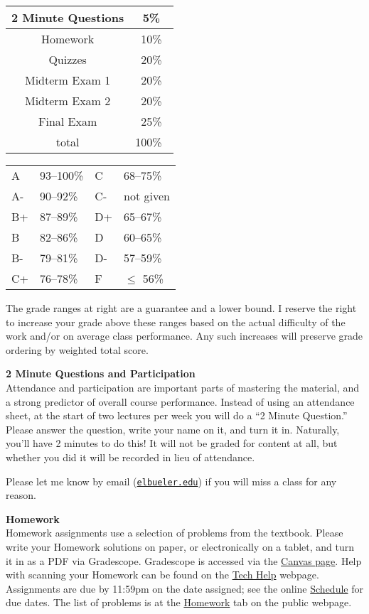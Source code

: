 \documentclass[12pt]{article}
\renewcommand{\emph}[1]{\textsf{\textbf{#1}}}
\newcommand{\localhead}[1]{\par\smallskip\textbf{#1} \smallskip\nobreak\\}%
\def\heading#1{\localhead{\large\emph{#1}}}
\begin{document}
\begin{multicols}{2}
\begin{tabular}{|c|c|}
\hline
2 Minute Questions & 5\%\\
\hline
Homework & 10\% \\
\hline
Quizzes & 20\% \\
\hline
Midterm Exam 1 & 20\% \\
\hline
Midterm Exam 2 & 20\%  \\
\hline
Final Exam & 25\% \\
\hline
total & 100\% \, \\
\hline
\end{tabular}


\begin{tabular}{llll}
A  & 93--100\%& C  & 68--75\%  \\
A- & 90--92\% & C- & not given \\
B+ & 87--89\% & D+ & 65--67\%  \\
B  & 82--86\% & D  & 60--65\%  \\
B- & 79--81\% & D- & 57--59\%  \\
C+ & 76--78\% & F  & $\le$ 56\%
\end{tabular}
\end{multicols}

The grade ranges at right are a guarantee and a lower bound. I reserve the right to increase your grade above these ranges based on the actual difficulty of the work and/or on average class performance.  Any such increases will preserve grade ordering by weighted total score. 


\heading{2 Minute Questions and Participation}
Attendance and participation are important parts of mastering the material, and a strong predictor of overall course performance.  Instead of using an attendance sheet, at the start of two lectures per week you will do a ``2 Minute Question.''  Please answer the question, write your name on it, and turn it in.  Naturally, you'll have 2 minutes to do this!  It will not be graded for content at all, but whether you did it will be recorded in lieu of attendance.

Please let me know by email (\href{mailto:elbueler@alaska.edu}{\texttt{elbueler\@@alaska.edu}}) if you will miss a class for any reason.


\heading{Homework}
Homework assignments use a selection of problems from the textbook.  Please write your Homework solutions on paper, or electronically on a tablet, and turn it in as a PDF via Gradescope.  Gradescope is accessed via the \href{https://canvas.alaska.edu/courses/18805}{Canvas page}.  Help with scanning your Homework can be found on the \href{https://uaf-math251.github.io/calc2/techHelp.html}{Tech Help} webpage.  Assignments are due by 11:59pm on the date assigned; see the online \href{https://uaf-math251.github.io/calc2/assets/general/S24/Bueler/schedule.pdf}{Schedule} for due dates.  The list of problems is at the \href{https://uaf-math251.github.io/calc2/homework.html}{Homework} tab on the public webpage.
\end{document}
